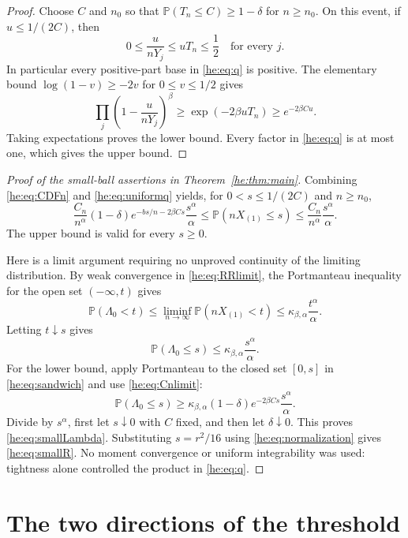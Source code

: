 \documentclass[11pt,a4paper]{article}
\theoremstyle{definition}
\theoremstyle{remark}
\newcommand{\PP}{\mathbb P}
\begin{document}
\begin{proof}
Choose $C$ and $n_0$ so that
$\PP(T_n\leq C)\geq1-\delta$ for $n\geq n_0$.
On this event, if $u\leq1/(2C)$, then
\[
 0\leq\frac{u}{nY_j}\leq uT_n\leq\frac12
 \quad\text{for every }j.
\]
In particular every positive-part base in \eqref{he:eq:q} is positive.
The elementary bound $\log(1-v)\geq-2v$ for $0\leq v\leq1/2$
gives
\[
 \prod_j\left(1-\frac{u}{nY_j}\right)^\beta
 \geq\exp(-2\beta uT_n)
 \geq e^{-2\beta Cu}.
\]
Taking expectations proves the lower bound.  Every factor in
\eqref{he:eq:q} is at most one, which gives the upper bound.
\end{proof}

\begin{proof}[Proof of the small-ball assertions in Theorem~\ref{he:thm:main}]
Combining \eqref{he:eq:CDFn} and \eqref{he:eq:uniformq} yields, for
$0<s\leq1/(2C)$ and $n\geq n_0$,
\begin{equation}\label{he:eq:sandwich}
 \frac{C_n}{n^\alpha}(1-\delta)
 e^{-bs/n-2\beta Cs}\frac{s^\alpha}{\alpha}
 \leq\PP(nX_{(1)}\leq s)
 \leq\frac{C_n}{n^\alpha}\frac{s^\alpha}{\alpha}.
\end{equation}
The upper bound is valid for every $s\geq0$.

Here is a limit argument requiring no unproved continuity of the
limiting distribution.  By weak convergence in \eqref{he:eq:RRlimit},
the Portmanteau inequality for the open set $(-\infty,t)$ gives
\[
 \PP(\Lambda_0<t)
 \leq\liminf_{n\to\infty}\PP(nX_{(1)}<t)
 \leq\kappa_{\beta,\alpha}\frac{t^\alpha}{\alpha}.
\]
Letting $t\downarrow s$ gives
\[
 \PP(\Lambda_0\leq s)
 \leq\kappa_{\beta,\alpha}\frac{s^\alpha}{\alpha}.
\]
For the lower bound, apply Portmanteau to the closed set $[0,s]$
in \eqref{he:eq:sandwich} and use \eqref{he:eq:Cnlimit}:
\[
 \PP(\Lambda_0\leq s)
 \geq\kappa_{\beta,\alpha}(1-\delta)e^{-2\beta Cs}
             \frac{s^\alpha}{\alpha}.
\]
Divide by $s^\alpha$, first let $s\downarrow0$ with $C$ fixed,
and then let $\delta\downarrow0$.
This proves \eqref{he:eq:smallLambda}.
Substituting $s=r^2/16$ using \eqref{he:eq:normalization} gives
\eqref{he:eq:smallR}.  No moment convergence or uniform integrability
was used: tightness alone controlled the product in \eqref{he:eq:q}.
\end{proof}

\section{The two directions of the threshold}
\end{document}
